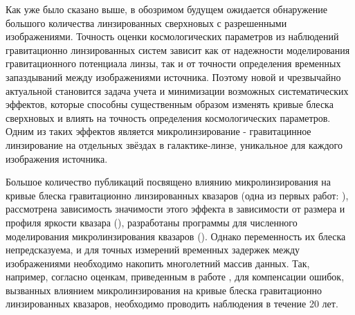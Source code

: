 Как уже было сказано выше, в обозримом будущем ожидается обнаружение большого количества линзированных сверхновых с разрешенными изображениями.  Точность оценки космологических параметров из наблюдений гравитационно линзированных систем зависит как от надежности моделирования гравитационного потенциала линзы, так и от точности определения временных запаздываний между изображениями источника. Поэтому новой и чрезвычайно актуальной становится задача учета и минимизации возможных систематических эффектов, которые способны существенным образом изменять кривые блеска сверхновых и влиять на точность определения космологических параметров. Одним из таких эффектов является микролинзирование - гравитацинное линзирование на отдельных звёздах в галактике-линзе, уникальное для каждого изображения источника.  

Большое количество публикаций посвящено влиянию микролинзирования на кривые блеска гравитационно линзированных квазаров (одна из первых работ: \cite{changrefsdal1979}), рассмотрена зависимость значимости этого эффекта в зависимости от размера и профиля яркости квазара (\cite{sizeiseverything}), разработаны программы для численного моделирования микролинзирования квазаров (\cite{wambsganss1990-thesis}). Однако переменность их блеска непредсказуема, и для точных измерений временных задержек между изображениями необходимо накопить многолетний массив данных. Так, например, согласно оценкам, приведенным в работе \cite{20years}, для компенсации ошибок, вызванных влиянием микролинзирования на кривые блеска гравитационно линзированных квазаров, необходимо проводить наблюдения в течение 20 лет. 


